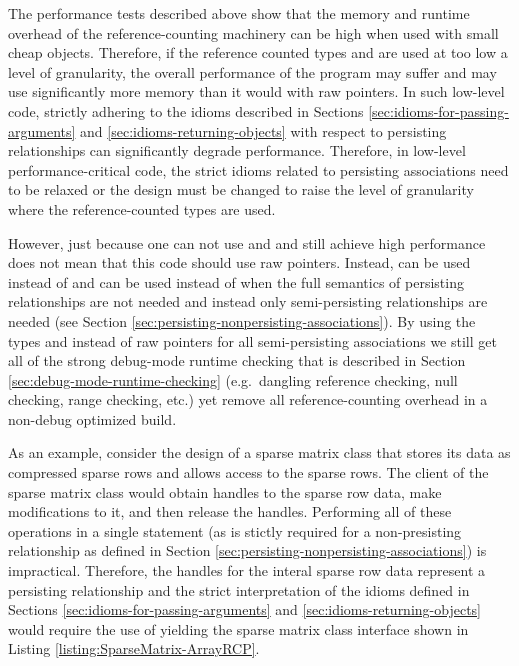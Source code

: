 \documentclass[pdf,ps2pdf,11pt]{SANDreport}
\begin{document}
The performance tests described above show that the memory and runtime
overhead of the reference-counting machinery can be high when used
with small cheap objects.  Therefore, if the reference counted types
{} and {} are used at too low a level of
granularity, the overall performance of the program may suffer and may
use significantly more memory than it would with raw pointers.  In
such low-level code, strictly adhering to the idioms described in
Sections {}\ref{sec:idioms-for-passing-arguments} and
{}\ref{sec:idioms-returning-objects} with respect to persisting
relationships can significantly degrade performance.  Therefore, in
low-level performance-critical code, the strict idioms related to
persisting associations need to be relaxed or the design must be
changed to raise the level of granularity where the reference-counted
types are used.

However, just because one can not use {} and
{} and still achieve high performance does not mean
that this code should use raw pointers.  Instead, {} can
be used instead of {} and {} can be used
instead of {} when the full semantics of persisting
relationships are not needed and instead only semi-persisting
relationships are needed (see Section
{}\ref{sec:persisting-nonpersisting-associations}).  By using the
types {} and {} instead of raw pointers
for all semi-persisting associations we still get all of the strong
debug-mode runtime checking that is described in Section
{}\ref{sec:debug-mode-runtime-checking} (e.g.\ dangling reference
checking, null checking, range checking, etc.) yet remove all
reference-counting overhead in a non-debug optimized build.

As an example, consider the design of a sparse matrix class that
stores its data as compressed sparse rows and allows access to the
sparse rows.  The client of the sparse matrix class would obtain
handles to the sparse row data, make modifications to it, and then
release the handles.  Performing all of these operations in a single
statement (as is stictly required for a non-presisting relationship as
defined in Section {}\ref{sec:persisting-nonpersisting-associations})
is impractical.  Therefore, the handles for the interal sparse row
data represent a persisting relationship and the strict interpretation
of the idioms defined in Sections
{}\ref{sec:idioms-for-passing-arguments} and
{}\ref{sec:idioms-returning-objects} would require the use of
{} yielding the sparse matrix class interface shown
in Listing {}\ref{listing:SparseMatrix-ArrayRCP}.
\end{document}

